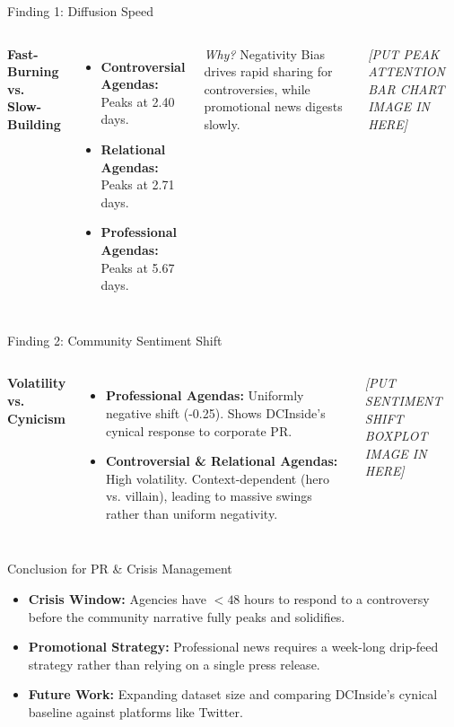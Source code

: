 \documentclass[aspectratio=169]{beamer}
\begin{document}
\begin{frame}{Finding 1: Diffusion Speed}
    \begin{columns}
        \textbf{Fast-Burning vs. Slow-Building}
        \begin{itemize}
            \item \textbf{Controversial Agendas:} Peaks at 2.40 days.
            \item \textbf{Relational Agendas:} Peaks at 2.71 days.
            \item \textbf{Professional Agendas:} Peaks at 5.67 days.
        \end{itemize}
        \vspace{0.5cm}
        \textit{Why?} Negativity Bias drives rapid sharing for controversies, while promotional news digests slowly.
        
        \begin{center}
            \textit{[PUT PEAK ATTENTION BAR CHART IMAGE IN HERE]}
        \end{center}
    \end{columns}
\end{frame}

\begin{frame}{Finding 2: Community Sentiment Shift}
    \begin{columns}
        \textbf{Volatility vs. Cynicism}
        \begin{itemize}
            \item \textbf{Professional Agendas:} Uniformly negative shift (-0.25). Shows DCInside's cynical response to corporate PR.
            \item \textbf{Controversial \& Relational Agendas:} High volatility. Context-dependent (hero vs. villain), leading to massive swings rather than uniform negativity.
        \end{itemize}
        
        \begin{center}
            \textit{[PUT SENTIMENT SHIFT BOXPLOT IMAGE IN HERE]}
        \end{center}
    \end{columns}
\end{frame}

\begin{frame}{Conclusion for PR \& Crisis Management}
    \begin{itemize}
        \item \textbf{Crisis Window:} Agencies have $< 48$ hours to respond to a controversy before the community narrative fully peaks and solidifies.
        \item \textbf{Promotional Strategy:} Professional news requires a week-long drip-feed strategy rather than relying on a single press release.
        \item \textbf{Future Work:} Expanding dataset size and comparing DCInside's cynical baseline against platforms like Twitter.
    \end{itemize}
\end{frame}
\end{document}
